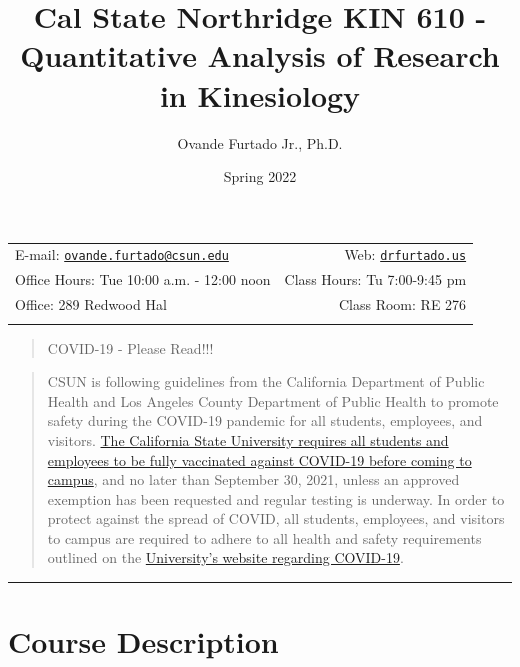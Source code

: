 \documentclass[11pt,]{article}
\title{Cal State Northridge \textbar{} KIN 610 - Quantitative Analysis
of Research in Kinesiology}
\author{Ovande Furtado Jr., Ph.D.}
\date{Spring 2022}
\begin{document}
  

		\maketitle
		
	
		\thispagestyle{firststyle}



	\noindent \begin{tabular*}{\textwidth}{ @{\extracolsep{\fill}} lr @{\extracolsep{\fill}}}


E-mail: \texttt{\href{mailto:ovande.furtado@csun.edu}{\nolinkurl{ovande.furtado@csun.edu}}} & Web: \href{http://drfurtado.us}{\tt drfurtado.us}\\
Office Hours: Tue 10:00 a.m. - 12:00 noon  &  Class Hours: Tu 7:00-9:45
pm\\
Office: 289 Redwood Hal  & Class Room: RE 276\\
	&  \\
	\hline
	\end{tabular*}
	
\vspace{2mm}
	


\begin{quote}
COVID-19 - Please Read!!!
\end{quote}

\begin{quote}
CSUN is following guidelines from the California Department of Public
Health and Los Angeles County Department of Public Health to promote
safety during the COVID-19 pandemic for all students, employees, and
visitors.
\href{http://www.csun.edu/ua/email/NCpages/0813_student_vaccination.html}{The
California State University requires all students and employees to be
fully vaccinated against COVID-19 before coming to campus}, and no later
than September 30, 2021, unless an approved exemption has been requested
and regular testing is underway. In order to protect against the spread
of COVID, all students, employees, and visitors to campus are required
to adhere to all health and safety requirements outlined on the
\href{https://www.csun.edu/matadors-forward/health-and-safety}{University's
website regarding COVID-19}.
\end{quote}

\begin{center}\rule{0.5\linewidth}{0.5pt}\end{center}

\hypertarget{course-description}{%
\section{Course Description}\label{course-description}}
\end{document}
